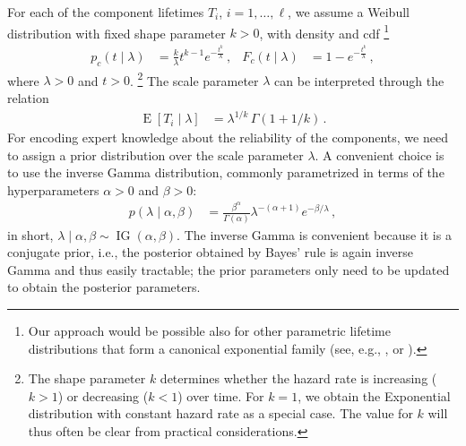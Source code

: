 \documentclass[12pt,a4paper,twocolumn,fleqn]{narms}
\newcommand{\E}{\operatorname{E}}
\newcommand{\ig}{\operatorname{IG}}   %
\begin{document}
For each of the component lifetimes $T_i$, $i=1,\ldots,\ell$,
we assume a Weibull distribution with fixed shape parameter $k > 0$, with density and cdf%
\footnote{Our approach would be possible also for other parametric lifetime distributions
that form a canonical exponential family
(see, e.g., , or ).}
\begin{align}
p_c(t \mid \lambda) &= \frac{k}{\lambda} t^{k-1} e^{-\frac{t^k}{\lambda}}\,, 
&
F_c(t \mid \lambda) &= 1 - e^{-\frac{t^k}{\lambda}} \,,
\label{eq:weibull-pdf-cdf}
\end{align}
where $\lambda > 0$ and $t > 0$.%
\footnote{The shape parameter $k$ determines whether the hazard rate is increasing ($k > 1$)
or decreasing ($k < 1$) over time.
For $k=1$, we obtain the Exponential distribution with constant hazard rate as a special case.
The value for $k$ will thus often be clear from practical considerations.}
The scale parameter $\lambda$ can be interpreted through the relation
\begin{align}
\E[T_i \mid \lambda] &= \lambda^{1/k}\, \Gamma(1 + 1/k)\,.
\label{eq:lambdainterpret}
\end{align}
For encoding expert knowledge about the reliability of the components,
we need to assign a prior distribution over the scale parameter $\lambda$.
A convenient choice is to use the inverse Gamma distribution,
commonly parametrized in terms of the hyperparameters $\alpha > 0$ and $\beta > 0$:
\begin{align}
p(\lambda \mid \alpha, \beta) &= \frac{\beta^\alpha}{\Gamma(\alpha)} \lambda^{-(\alpha + 1)} e^{-\beta/\lambda} \,,
\end{align}
in short, $\lambda \mid \alpha, \beta \sim \ig(\alpha, \beta)$.
The inverse Gamma is convenient because it is a conjugate prior,
i.e., the posterior obtained by Bayes' rule is again inverse Gamma and thus easily tractable;
the prior parameters only need to be updated to obtain the posterior parameters.
\end{document}
